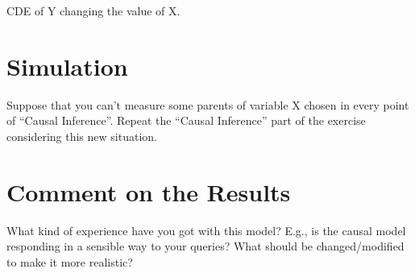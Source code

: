 \documentclass[a4paper,12pt]{article} %
\begin{document}
 CDE of Y changing the value of X.

\section{Simulation}
Suppose that you can’t measure some parents of variable X chosen in every point of “Causal Inference”.
Repeat the “Causal Inference” part of the exercise considering this new situation.

\section{Comment on the Results}
What kind of experience have you got with this model? E.g., is the causal model responding in a sensible way to your queries? What should be changed/modified to make it more realistic?
\end{document}
